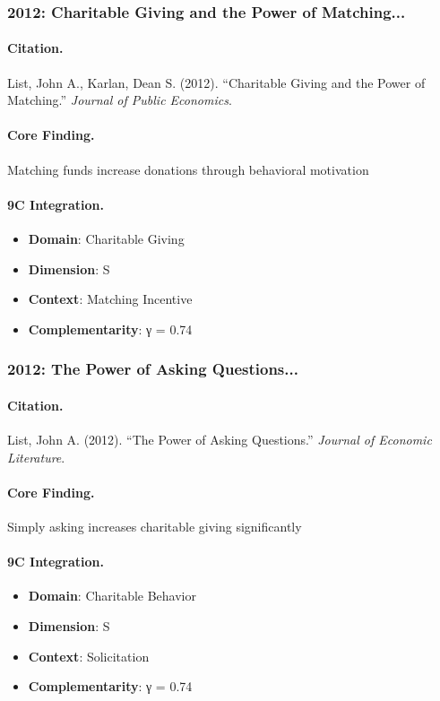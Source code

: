 \subsubsection{2012: Charitable Giving and the Power of Matching...}

\paragraph{Citation.}
List, John A., Karlan, Dean S. (2012). ``Charitable Giving and the Power of Matching.''
\textit{Journal of Public Economics}.

\paragraph{Core Finding.}
Matching funds increase donations through behavioral motivation

\paragraph{9C Integration.}
\begin{itemize}[nosep]
  \item \textbf{Domain}: Charitable Giving
  \item \textbf{Dimension}: S
  \item \textbf{Context}: Matching Incentive
  \item \textbf{Complementarity}: γ = 0.74
\end{itemize}


\subsubsection{2012: The Power of Asking Questions...}

\paragraph{Citation.}
List, John A. (2012). ``The Power of Asking Questions.''
\textit{Journal of Economic Literature}.

\paragraph{Core Finding.}
Simply asking increases charitable giving significantly

\paragraph{9C Integration.}
\begin{itemize}[nosep]
  \item \textbf{Domain}: Charitable Behavior
  \item \textbf{Dimension}: S
  \item \textbf{Context}: Solicitation
  \item \textbf{Complementarity}: γ = 0.74
\end{itemize}


